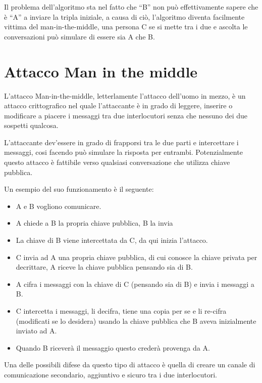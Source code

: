 Il problema dell’algoritmo sta nel fatto che “B” non può effettivamente sapere che è “A” a inviare la tripla iniziale, a causa di ciò, l’algoritmo diventa facilmente vittima del man-in-the-middle, una persona C se si mette tra i due e ascolta le conversazioni può simulare di essere sia A che B.

\section{Attacco Man in the middle}

L’attacco Man-in-the-middle, letterlamente l’attacco dell’uomo in mezzo, è un attacco crittografico nel quale l’attaccante è in grado di leggere, inserire o modificare a piacere i messaggi tra due interlocutori senza che nessuno dei due sospetti qualcosa.

L’attaccante dev’essere in grado di frapporsi tra le due parti e intercettare i messaggi, cosi facendo può simulare la risposta per entrambi.
Potenzialmente questo attacco è fattibile verso qualsiasi conversazione che utilizza chiave pubblica.

Un esempio del suo funzionamento è il seguente:
\begin{itemize}
\item	A e B vogliono comunicare.
\item	A chiede a B la propria chiave pubblica, B la invia
\item	La chiave di B viene intercettata da C, da qui inizia l’attacco.
\item	C invia ad A una propria chiave pubblica, di cui conosce la chiave privata per decrittare, A riceve la chiave pubblica pensando sia di B.
\item	A cifra i messaggi con la chiave di C (pensando sia di B) e invia i messaggi a B.
\item	C intercetta i messaggi, li decifra, tiene una copia per se e li re-cifra (modificati se lo desidera) usando la chiave pubblica che B aveva inizialmente inviato ad A.
\item	Quando B riceverà il messaggio questo crederà provenga da A.
\end{itemize}
Una delle possibili difese da questo tipo di attacco è quella di creare un canale di comunicazione secondario, aggiuntivo e sicuro tra i due interlocutori.

